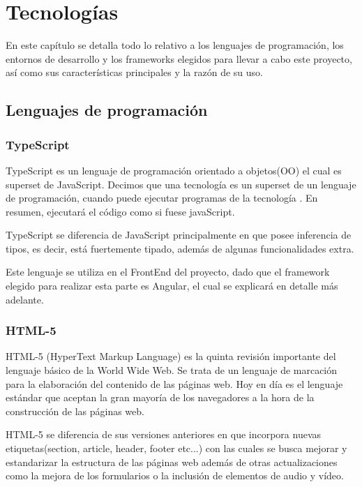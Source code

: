 \chapter{Tecnologías}
 En este capítulo se detalla todo lo relativo a los lenguajes de programación, los entornos de desarrollo y los frameworks elegidos para llevar a cabo este proyecto, así como sus características principales y la razón de su uso.
    
    \section{Lenguajes de programación}
    
    \subsection{TypeScript}
    TypeScript es un lenguaje de programación orientado a objetos(OO) el cual es superset de JavaScript. 
    Decimos que una tecnología es un superset de un lenguaje de programación, cuando puede ejecutar programas de la tecnología \cite{typescript}. En resumen, ejecutará el código como si fuese javaScript. \newline
        
    TypeScript se diferencia de JavaScript principalmente en que posee inferencia de tipos, es decir, está fuertemente tipado, además de algunas funcionalidades extra.
    \newline
        
    Este lenguaje se utiliza en el FrontEnd del proyecto, dado que el framework elegido para realizar esta parte es Angular, el cual se explicará en detalle más adelante.
        
    \subsection{HTML-5}
    HTML-5 (HyperText Markup Language) es la quinta revisión importante del lenguaje básico de la World Wide Web\cite{html}. Se trata de un lenguaje de marcación para la elaboración del contenido de las páginas web.
    Hoy en día es el lenguaje estándar que aceptan la gran mayoría de los navegadores a la hora de la construcción de las páginas web.
    \newline
     
    HTML-5 se diferencia de sus versiones anteriores en que incorpora nuevas etiquetas(section, article, header, footer etc...) con las cuales se busca mejorar y estandarizar la estructura de las páginas web además de otras actualizaciones como la mejora de los formularios o la inclusión de elementos de audio y vídeo.
    \newline
    

